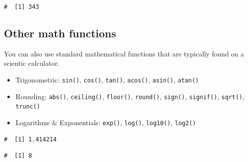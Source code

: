 \documentclass[a4paper,9pt,twocolumn,twoside,printwatermark=false]{pinp}
\providecommand{\tightlist}{%
  \setlength{\itemsep}{0pt}\setlength{\parskip}{0pt}}
\begin{document}
\begin{ShadedResult}
\begin{verbatim}
#  [1] 343
\end{verbatim}
\end{ShadedResult}

\subsection{Other math functions}\label{other-math-functions}

You can also use standard mathematical functions that are typically
found on a scientic calculator.

\begin{itemize}
\tightlist
\item
  Trigonometric: \texttt{sin()}, \texttt{cos()}, \texttt{tan()},
  \texttt{acos()}, \texttt{asin()}, \texttt{atan()}
\item
  Rounding: \texttt{abs()}, \texttt{ceiling()}, \texttt{floor()},
  \texttt{round()}, \texttt{sign()}, \texttt{signif()}, \texttt{sqrt()},
  \texttt{trunc()}
\item
  Logarithms \& Exponentials: \texttt{exp()}, \texttt{log()},
  \texttt{log10()}, \texttt{log2()}
\end{itemize}

\begin{Shaded}
\begin{Highlighting}[]
\NormalTok{(}\NormalTok{)          }
\end{Highlighting}
\end{Shaded}

\begin{ShadedResult}
\begin{verbatim}
#  [1] 1.414214
\end{verbatim}
\end{ShadedResult}

\begin{Shaded}
\begin{Highlighting}[]
\NormalTok{(}\NormalTok{)}
\end{Highlighting}
\end{Shaded}

\begin{ShadedResult}
\begin{verbatim}
#  [1] 8
\end{verbatim}
\end{ShadedResult}
\end{document}
